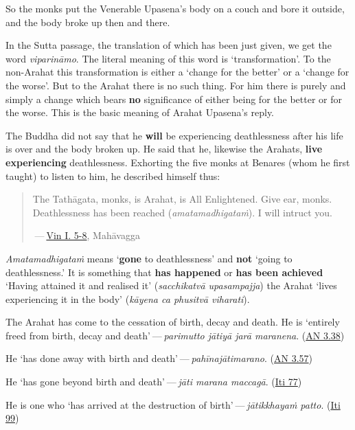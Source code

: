So the monks put the Venerable Upasena's body on a couch and bore it outside, and the body broke up then and there.

In the Sutta passage, the translation of which has been just given, we get the word \emph{viparināmo}. The literal meaning of this word is `transformation'. To the non-Arahat this transformation is either a `change for the better' or a `change for the worse'. But to the Arahat there is no such thing. For him there is purely and simply a change which bears \textbf{no} significance of either being for the better or for the worse. This is the basic meaning of Arahat Upasena's reply.

The Buddha did not say that he \textbf{will} be experiencing deathlessness after his life is over and the body broken up. He said that he, likewise the Arahats, \textbf{live experiencing} deathlessness. Exhorting the five monks at Benares (whom he first taught) to listen to him, he described himself thus:

\begin{quote}
The Tathāgata, monks, is Arahat, is All Enlightened. Give ear, monks. Deathlessness has been reached (\emph{amatamadhigataṁ}). I will intruct you.

 --- \href{https://suttacentral.net/pli-tv-kd1/en/brahmali}{Vin I. 5-8}, Mahāvagga
\end{quote}

\emph{Amatamadhigataṁ} means `\textbf{gone} to deathlessness' and \textbf{not} `going to deathlessness.' It is something that \textbf{has happened} or \textbf{has been achieved} `Having attained it and realised it' (\emph{sacchikatvā upasampajja}) the Arahat `lives experiencing it in the body' (\emph{kāyena ca phusitvā viharati}).

The Arahat has come to the cessation of birth, decay and death. He is `entirely freed from birth, decay and death' --- \emph{parimutto jātiyā jarā maranena}. (\href{https://suttacentral.net/an3.38/en/bodhi}{AN 3.38})

He `has done away with birth and death' --- \emph{pahīnajātimarano}. (\href{https://suttacentral.net/an3.57/en/bodhi}{AN 3.57})

He `has gone beyond birth and death' --- \emph{jāti marana maccagā}. (\href{https://suttacentral.net/iti77/en/sujato}{Iti 77})

He is one who `has arrived at the destruction of birth' --- \emph{jātikkhayaṁ patto}. (\href{https://suttacentral.net/iti99/en/sujato}{Iti 99})

